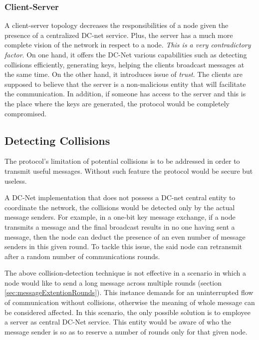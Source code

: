 \subsubsection{Client-Server} \label{sec:clientserver}
A client-server topology decreases the responsibilities of a node given the presence of a centralized DC-net service. Plus, the server has a much more complete vision of the network in respect to a node. \emph{This is a very contradictory factor}. On one hand, it offers the DC-Net various capabilities such as detecting collisions efficiently, generating keys, helping the clients broadcast messages at the same time. On the other hand, it introduces issue of \emph{trust}. The clients are supposed to believe that the server is a non-malicious entity that will facilitate the communication. In addition, if someone has access to the server and this is the place where the keys are generated, the protocol would be completely compromised.

\subsection{Detecting Collisions}
The protocol's limitation of potential collisions is to be addressed in order to transmit useful messages. Without such feature the protocol would be secure but useless. \newline

A DC-Net implementation that does not possess a DC-net central entity to coordinate the network, the collisions would be detected only by the actual message senders. For example, in a one-bit key message exchange, if a node transmits a message and the final broadcast results in no one having sent a message, then the node can deduct the presence of an even number of message senders in this given round. To tackle this issue, the said node can retransmit after a random number of communications rounds. \newline

The above collision-detection technique is not effective in a scenario in which a node would like to send a long message across multiple rounds (section \ref{sec:messageExtentionRounds}). This instance demands for an uninterrupted flow of communication without collisions, otherwise the meaning of whole message can be considered affected.
In this scenario, the only possible solution is to employee a server as central DC-Net service. This entity would be aware of who the message sender is so as to reserve a number of rounds only for that given node.


